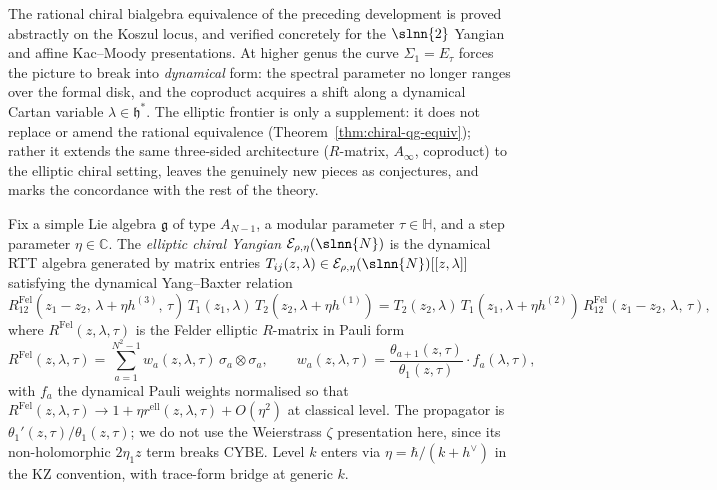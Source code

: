 The rational chiral bialgebra equivalence of the preceding
development is proved abstractly on the Koszul locus, and verified
concretely for the $\slnn{2}$ Yangian and affine Kac--Moody
presentations. At higher genus the curve $\Sigma_1 = E_\tau$ forces
the picture to break into \emph{dynamical} form: the spectral
parameter no longer ranges over the formal disk, and the coproduct
acquires a shift along a dynamical Cartan variable $\lambda \in
\mathfrak h^*$. The elliptic frontier is only a supplement: it does
not replace or amend the rational
equivalence (Theorem~\ref{thm:chiral-qg-equiv}); rather it extends
the same three-sided architecture ($R$-matrix, $A_\infty$,
coproduct) to the elliptic chiral setting, leaves the genuinely
new pieces as conjectures, and marks the concordance with the rest
of the theory.

\begin{definition}
\label{def:elliptic-yangian}
Fix a simple Lie algebra $\mathfrak g$ of type $A_{N-1}$, a modular
parameter $\tau \in \mathbb H$, and a step parameter $\eta \in
\mathbb C$. The \emph{elliptic chiral Yangian}
$\mathcal E_{\rho,\eta}(\slnn{N})$ is the dynamical RTT algebra
generated by matrix entries
$T_{ij}(z,\lambda) \in \mathcal E_{\rho,\eta}(\slnn{N})[[z,\lambda]]$
satisfying the dynamical Yang--Baxter relation
\[
R^{\mathrm{Fel}}_{12}(z_1 - z_2,\, \lambda + \eta h^{(3)},\, \tau)\,
T_1(z_1,\lambda)\, T_2(z_2,\lambda + \eta h^{(1)})
= T_2(z_2,\lambda)\, T_1(z_1,\lambda + \eta h^{(2)})\,
R^{\mathrm{Fel}}_{12}(z_1 - z_2,\,\lambda,\,\tau),
\]
where $R^{\mathrm{Fel}}(z,\lambda,\tau)$ is the Felder elliptic
$R$-matrix in Pauli form
\[
R^{\mathrm{Fel}}(z,\lambda,\tau)
= \sum_{a=1}^{N^2-1} w_a(z,\lambda,\tau)\,\sigma_a \otimes \sigma_a,
\qquad
w_a(z,\lambda,\tau) = \frac{\theta_{a+1}(z,\tau)}{\theta_1(z,\tau)}
\cdot f_a(\lambda,\tau),
\]
with $f_a$ the dynamical Pauli weights normalised so that
$R^{\mathrm{Fel}}(z,\lambda,\tau) \to 1 + \eta r^{\mathrm{ell}}(z,
\lambda,\tau) + O(\eta^2)$ at classical level. The propagator is
$\theta_1'(z,\tau)/\theta_1(z,\tau)$; we do not use the Weierstrass
$\zeta$ presentation here, since its non-holomorphic $2\eta_1 z$
term breaks CYBE. Level $k$ enters via $\eta = \hbar/(k+h^\vee)$ in the KZ
convention, with trace-form bridge at generic $k$.
\end{definition}

